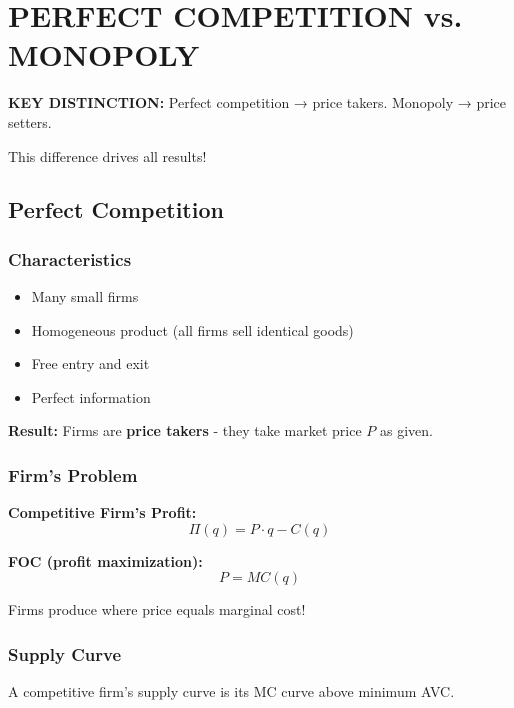 \documentclass[10pt,letterpaper]{article}
\begin{document}
\newpage

\section{PERFECT COMPETITION vs. MONOPOLY}

\begin{criticalbox}
\textbf{KEY DISTINCTION:} Perfect competition → price takers. Monopoly → price setters.

This difference drives all results!
\end{criticalbox}

\subsection{Perfect Competition}

\subsubsection{Characteristics}

\begin{itemize}
  \item Many small firms
  \item Homogeneous product (all firms sell identical goods)
  \item Free entry and exit
  \item Perfect information
\end{itemize}

\textbf{Result:} Firms are \textbf{price takers} - they take market price $P$ as given.

\subsubsection{Firm's Problem}

\begin{formulabox}
\textbf{Competitive Firm's Profit:}
\[
\boxed{\Pi(q) = P \cdot q - C(q)}
\]

\textbf{FOC (profit maximization):}
\[
\boxed{P = MC(q)}
\]

Firms produce where price equals marginal cost!
\end{formulabox}

\subsubsection{Supply Curve}

A competitive firm's supply curve is its MC curve above minimum AVC.
\end{document}
